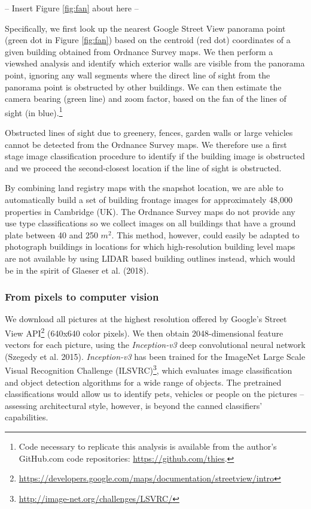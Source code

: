 \documentclass[]{article}
\let\rmarkdownfootnote\footnote%
\def\footnote{\protect\rmarkdownfootnote}
\begin{document}
\begin{center}
  -- Insert Figure \ref{fig:fan} about here --
\end{center}

Specifically, we first look up the nearest Google Street View panorama
point (green dot in Figure \ref{fig:fan}) based on the centroid (red
dot) coordinates of a given building obtained from Ordnance Survey maps.
We then perform a viewshed analysis and identify which exterior walls
are visible from the panorama point, ignoring any wall segments where
the direct line of sight from the panorama point is obstructed by other
buildings. We can then estimate the camera bearing (green line) and zoom
factor, based on the fan of the lines of sight (in
blue).\footnote{Code necessary to replicate this analysis is available from the author's GitHub.com code repositories: \href{https://github.com/thies}{https://github.com/thies}.}

Obstructed lines of sight due to greenery, fences, garden walls or large
vehicles cannot be detected from the Ordnance Survey maps. We therefore
use a first stage image classification procedure to identify if the
building image is obstructed and we proceed the second-closest location
if the line of sight is obstructed.

By combining land registry maps with the snapshot location, we are able
to automatically build a set of building frontage images for
approximately 48,000 properties in Cambridge (UK). The Ordnance Survey
maps do not provide any use type classifications so we collect images on
all buildings that have a ground plate between 40 and 250 \(m^2\). This
method, however, could easily be adapted to photograph buildings in
locations for which high-resolution building level maps are not
available by using LIDAR based building outlines instead, which would be
in the spirit of Glaeser et al. (2018).

\hypertarget{from-pixels-to-computer-vision}{%
\subsubsection{From pixels to computer
vision}\label{from-pixels-to-computer-vision}}

We download all pictures at the highest resolution offered by Google's
Street View
API\footnote{\href{https://developers.google.com/maps/documentation/streetview/intro}{https://developers.google.com/maps/documentation/streetview/intro}}
(640x640 color pixels). We then obtain 2048-dimensional feature vectors
for each picture, using the \emph{Inception-v3} deep convolutional
neural network (Szegedy et al. 2015). \emph{Inception-v3} has been
trained for the ImageNet Large Scale Visual Recognition Challenge
(ILSVRC)\footnote{\url{http://image-net.org/challenges/LSVRC/}}, which
evaluates image classification and object detection algorithms for a
wide range of objects. The pretrained classifications would allow us to
identify pets, vehicles or people on the pictures -- assessing
architectural style, however, is beyond the canned classifiers'
capabilities.
\end{document}
